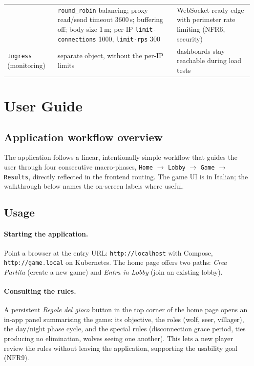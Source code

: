 \documentclass{scrartcl}
\begin{document}
\begin{table}
\begin{tabular}{@{}
            >{\raggedright\arraybackslash}p{2.8cm}
            >{\raggedright\arraybackslash}p{7.4cm}
            >{\raggedright\arraybackslash}p{3.0cm}@{}}
                            & \texttt{round\_robin} balancing; proxy read/send timeout 3600\,s; buffering
            off; body size 1\,m; per-IP \texttt{limit-connections} 1000,
            \texttt{limit-rps} 300
                            & WebSocket-ready edge with perimeter rate limiting (NFR6, security)                               \\
            \texttt{Ingress} (monitoring)
                            & separate object, without the per-IP limits
                            & dashboards stay reachable during load tests                                                      \\
            \bottomrule
      \end{tabular}
\end{table}

\section{User Guide}\label{user-guide}

\subsection{Application workflow overview}\label{workflow-overview}

The application follows a linear, intentionally simple workflow that guides the
user through four consecutive macro-phases,
\texttt{Home} $\rightarrow$ \texttt{Lobby} $\rightarrow$ \texttt{Game}
$\rightarrow$ \texttt{Results}, directly reflected in the frontend routing. The
game UI is in Italian; the walkthrough below names the on-screen labels where
useful.

\subsection{Usage}\label{sec:usage}

\paragraph{Starting the application.}
Point a browser at the entry URL: \texttt{http://localhost} with Compose,
\texttt{http://game.local} on Kubernetes. The home page offers two paths:
\emph{Crea Partita} (create a new game) and \emph{Entra in Lobby} (join an
existing lobby).

\paragraph{Consulting the rules.}
A persistent \emph{Regole del gioco} button in the top corner of the home
page opens an in-app panel summarising the game: its objective, the roles
(wolf, seer, villager), the day/night phase cycle, and the special rules
(disconnection grace period, ties producing no elimination, wolves seeing
one another). This lets a new player review the rules without leaving the
application, supporting the usability goal (NFR9).
\end{document}
